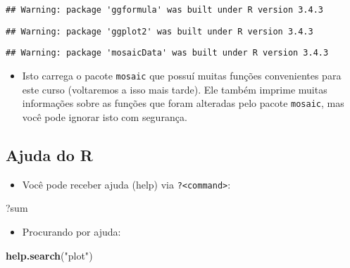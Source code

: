 \documentclass[]{article}
\newenvironment{Shaded}{\begin{snugshade}}{\end{snugshade}}
\newcommand{\KeywordTok}[1]{\textcolor[rgb]{0.13,0.29,0.53}{\textbf{#1}}}
\newcommand{\StringTok}[1]{\textcolor[rgb]{0.31,0.60,0.02}{#1}}
\newcommand{\NormalTok}[1]{#1}
\providecommand{\tightlist}{%
  \setlength{\itemsep}{0pt}\setlength{\parskip}{0pt}}
\begin{document}
\begin{verbatim}
## Warning: package 'ggformula' was built under R version 3.4.3
\end{verbatim}

\begin{verbatim}
## Warning: package 'ggplot2' was built under R version 3.4.3
\end{verbatim}

\begin{verbatim}
## Warning: package 'mosaicData' was built under R version 3.4.3
\end{verbatim}

\begin{itemize}
\tightlist
\item
  Isto carrega o pacote \texttt{mosaic} que possuí muitas funções
  convenientes para este curso (voltaremos a isso mais tarde). Ele
  também imprime muitas informações sobre as funções que foram alteradas
  pelo pacote \texttt{mosaic}, mas você pode ignorar isto com segurança.
\end{itemize}

\subsection{\texorpdfstring{Ajuda do
\textbf{R}}{Ajuda do R}}\label{ajuda-do-r}

\begin{itemize}
\tightlist
\item
  Você pode receber ajuda (help) via
  \texttt{?\textless{}command\textgreater{}}:
\end{itemize}

\begin{Shaded}
\begin{Highlighting}[]
\NormalTok{?sum}
\end{Highlighting}
\end{Shaded}

\begin{itemize}
\tightlist
\item
  Procurando por ajuda:
\end{itemize}

\begin{Shaded}
\begin{Highlighting}[]
\KeywordTok{help.search}\NormalTok{(}\StringTok{"plot"}\NormalTok{)}
\end{Highlighting}
\end{Shaded}
\end{document}
